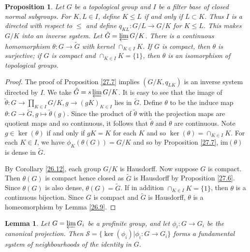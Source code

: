 \documentclass[12pt]{report}
\newtheorem{lemma}[theorem]{Lemma}
\newtheorem{proposition}[theorem]{Proposition}
{\theoremstyle{remark}\newtheorem*{remark}{Remark}}
\theoremstyle{definition}
\newcommand{\im}{\text{im}}
\begin{document}
\begin{proposition}\label{11.27.13}
	Let $G$ be a topological group and $I$ be a filter base of closed normal subgroups. For $K,L\in I$, define $K\leq L$ if and only if $L\subset K$. Thus $I$ is a directed with respect to $\leq$ and define $q_{KL}: G/L\to G/K$ for $K\leq L$. This makes $G/K$ into an inverse system. Let $\tilde{G}=\varprojlim G/K$. There is a continuous homomorphism $\theta: G\to \tilde{G}$ with kernel $\cap_{K\in I} K$. If $G$ is compact, then $\theta$ is surjective; if $G$ is compact and $\cap_{K\in I}K=\{1\}$, then $\theta$ is an isomorphism of topological groups.
\end{proposition}

\begin{proof}
	The proof of Proposition \ref{27.7} implies $(G/K,q_{LK})$ is an inverse system directed by $I$. We take $\tilde{G}=s\varprojlim G/K$. It is easy to see that the image of $\tilde{\theta}: G\to \prod_{K\in I} G/K, g\to (gK)_{K\in I}$ lies in $\tilde{G}$. Define $\theta$ to be the induce map $\theta: G\to \tilde{G}, g \mapsto \tilde{\theta}(g)$. Since the product of $\tilde{\theta}$ with the projection maps are quotient maps and so continuous, it follows that $\tilde{\theta}$ and $\theta$ are continuous. Note $g\in \ker(\theta)$ if and only if $gK=K$ for each $K$ and so $\ker(\theta)=\cap_{K\in I} K$. For each $K\in I$, we have $\phi_K(\theta(G))=G/K$ and so by Proposition \ref{27.7}, $\im(\theta)$ is dense in $\tilde{G}$.


	By Corollary \ref{26.12}, each group $G/K$ is Hausdorff. Now suppose $G$ is compact. Then $\theta(G)$ is compact hence closed as $\tilde{G}$ is Hausdorff by Proposition \ref{27.6}. Since $\theta(G)$ is also dense, $\theta(G)=\tilde{G}$. If in addition $\cap_{K\in I}K=\{1\}$, then $\theta$ is a continuous bijection. Since $G$ is compact and $\tilde{G}$ is Hausdorff, $\theta$ is a homeomorphism by Lemma \ref{26.9}.
\end{proof}

\begin{lemma}
	Let $G=\varprojlim G_i$ be a profinite group, and let $\phi_i: G\to G_i$ be the canonical projection. Then $\mathcal{S}=\{\ker(\phi_i)| \phi_i: G\to G_i\}$ forms a fundamental system of neighbourhoods of the identity in $G$.
\end{lemma}
\end{document}

